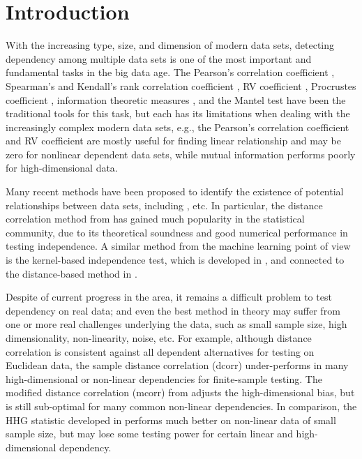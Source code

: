 \documentclass[11pt]{article}
\begin{document}
\clearpage
\tableofcontents


\newpage
{}

\section{Introduction}
With the increasing type, size, and dimension of modern data sets, detecting dependency among multiple data sets is one of the most important and fundamental tasks in the big data age. The Pearson's correlation coefficient \cite{Pearson1895}, Spearman's and Kendall's rank correlation coefficient \cite{KendallBook}, RV coefficient \cite{RobertEscoufier1976}, Procrustes coefficient \cite{GowerProcrustesBook}, information theoretic measures \cite{Renyi1959}, and the Mantel test \cite{Mantel1967} have been the traditional tools for this task, but each has its limitations when dealing with the increasingly complex modern data sets, e.g., the Pearson's correlation coefficient and RV coefficient are mostly useful for finding linear relationship and may be zero for nonlinear dependent data sets, while mutual information performs poorly for high-dimensional data. 

Many recent methods have been proposed to identify the existence of potential relationships between data sets, including \cite{Baringhaus2004,TaskinenOjaRandles2005, GrettonEtAl2005, SzekelyRizzoBakirov2007, GrettonGyorfi2010,Reshef2011, HellerGorfine2013, Reimherr2013, SzekelyRizzo2013a, SzekelyRizzo2013b}, etc. In particular, the distance correlation method from \cite{SzekelyRizzoBakirov2007, SzekelyRizzo2009, SzekelyRizzo2013a, SzekelyRizzo2014} has gained much popularity in the statistical community, due to its theoretical soundness and good numerical performance in testing independence. A similar method from the machine learning point of view is the kernel-based independence test, which is developed in \cite{GrettonEtAl2005, GrettonGyorfi2010, GrettonEtAl2012}, and connected to the distance-based method in \cite{SejdinovicEtAl2013}.

Despite of current progress in the area, it remains a difficult problem to test dependency on real data; and even the best method in theory may suffer from one or more real challenges underlying the data, such as small sample size, high dimensionality, non-linearity, noise, etc. For example, although distance correlation is consistent against all dependent alternatives for testing on Euclidean data, the sample distance correlation (dcorr) under-performs in many high-dimensional or non-linear dependencies for finite-sample testing. The modified distance correlation (mcorr) from \cite{SzekelyRizzo2013a} adjusts the high-dimensional bias, but is still sub-optimal for many common non-linear dependencies. In comparison, the HHG statistic developed in \cite{HellerGorfine2013} performs much better on non-linear data of small sample size, but may lose some testing power for certain linear and high-dimensional dependency.
\end{document}

